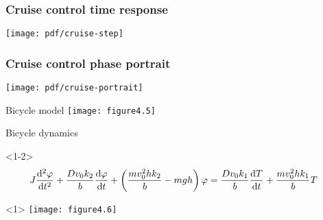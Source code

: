 \documentclass{beamer-control}
\begin{document}
\begin{frame}
\frametitle{Cruise control time response}
\centering
\texttt{[image: pdf/cruise-step]}

\end{frame}

\begin{frame}
\frametitle{Cruise control phase portrait}
\centering
\texttt{[image: pdf/cruise-portrait]}

\end{frame}


\begin{frame}{Bicycle model}
\texttt{[image: figure4.5]}
\end{frame}

\begin{frame}{Bicycle dynamics}
\begin{uncoverenv}<1-2>
\begin{align}
J \frac{\mathrm{d} ^2\varphi}{\mathrm{d} t^2} + \frac{Dv_0k_2}{b} \frac{\mathrm{d} \varphi}{\mathrm{d} t} + \left(\frac{mv_0^2hk_2}{b}-mgh\right)\varphi
&= \frac{Dv_0k_1}{b} \frac{\mathrm{d} T}{\mathrm{d} t} + \frac{mv_0^2hk_1}{b} T
\end{align}
\end{uncoverenv}
\begin{uncoverenv}<1>
\texttt{[image: figure4.6]}
\end{uncoverenv}

\end{frame}


\SUMMARYFRAME
\FINALE
\end{document}
